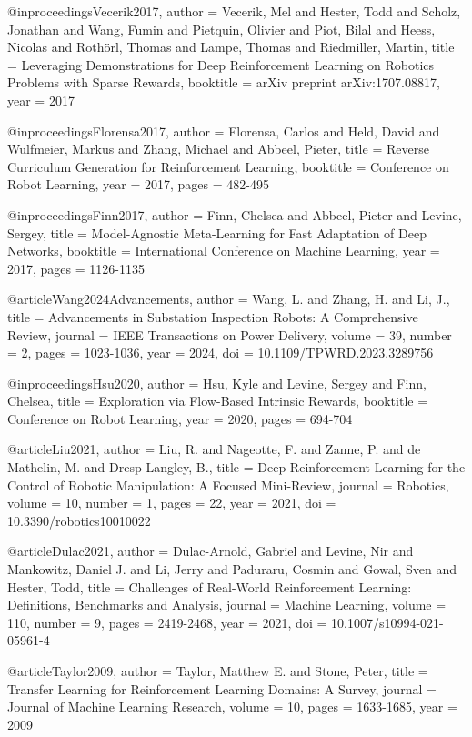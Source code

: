 @inproceedings{Vecerik2017,
  author = {Vecerik, Mel and Hester, Todd and Scholz, Jonathan and Wang, Fumin and Pietquin, Olivier and Piot, Bilal and Heess, Nicolas and Rothörl, Thomas and Lampe, Thomas and Riedmiller, Martin},
  title = {Leveraging Demonstrations for Deep Reinforcement Learning on Robotics Problems with Sparse Rewards},
  booktitle = {arXiv preprint arXiv:1707.08817},
  year = {2017}
}

@inproceedings{Florensa2017,
  author = {Florensa, Carlos and Held, David and Wulfmeier, Markus and Zhang, Michael and Abbeel, Pieter},
  title = {Reverse Curriculum Generation for Reinforcement Learning},
  booktitle = {Conference on Robot Learning},
  year = {2017},
  pages = {482-495}
}

@inproceedings{Finn2017,
  author = {Finn, Chelsea and Abbeel, Pieter and Levine, Sergey},
  title = {Model-Agnostic Meta-Learning for Fast Adaptation of Deep Networks},
  booktitle = {International Conference on Machine Learning},
  year = {2017},
  pages = {1126-1135}
}

@article{Wang2024Advancements,
  author = {Wang, L. and Zhang, H. and Li, J.},
  title = {Advancements in Substation Inspection Robots: A Comprehensive Review},
  journal = {IEEE Transactions on Power Delivery},
  volume = {39},
  number = {2},
  pages = {1023-1036},
  year = {2024},
  doi = {10.1109/TPWRD.2023.3289756}
}

@inproceedings{Hsu2020,
  author = {Hsu, Kyle and Levine, Sergey and Finn, Chelsea},
  title = {Exploration via Flow-Based Intrinsic Rewards},
  booktitle = {Conference on Robot Learning},
  year = {2020},
  pages = {694-704}
}

@article{Liu2021,
  author = {Liu, R. and Nageotte, F. and Zanne, P. and de Mathelin, M. and Dresp-Langley, B.},
  title = {Deep Reinforcement Learning for the Control of Robotic Manipulation: A Focused Mini-Review},
  journal = {Robotics},
  volume = {10},
  number = {1},
  pages = {22},
  year = {2021},
  doi = {10.3390/robotics10010022}
}

@article{Dulac2021,
  author = {Dulac-Arnold, Gabriel and Levine, Nir and Mankowitz, Daniel J. and Li, Jerry and Paduraru, Cosmin and Gowal, Sven and Hester, Todd},
  title = {Challenges of Real-World Reinforcement Learning: Definitions, Benchmarks and Analysis},
  journal = {Machine Learning},
  volume = {110},
  number = {9},
  pages = {2419-2468},
  year = {2021},
  doi = {10.1007/s10994-021-05961-4}
}

@article{Taylor2009,
  author = {Taylor, Matthew E. and Stone, Peter},
  title = {Transfer Learning for Reinforcement Learning Domains: A Survey},
  journal = {Journal of Machine Learning Research},
  volume = {10},
  pages = {1633-1685},
  year = {2009}
}

